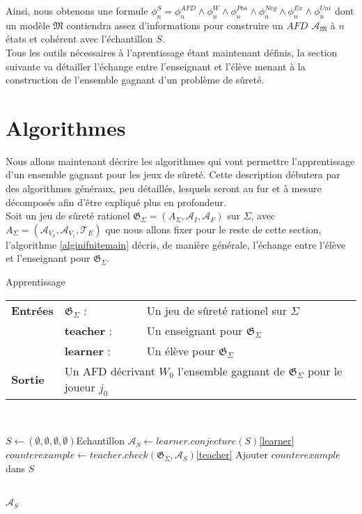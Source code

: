 \documentclass[12pt,a4paper,oneside,titlepage]{report}
\begin{document}
Ainsi, nous obtenons une formule $\phi^S_n=\phi_n^{AFD}\land\phi_n^{W}\land\phi_n^{Pos}\land\phi_n^{Neg}\land\phi_n^{Ex}\land\phi_n^{Uni}$ dont un modèle $\mathfrak{M}$ contiendra assez d'informations pour construire un $AFD$ $\mathcal{A}_\mathfrak{M}$ à $n$ états et cohérent avec l'échantillon $S$.\\

Tous les outils nécessaires à l'aprentissage étant maintenant définis, la section suivante va détailler l'échange entre l'enseignant et l'élève menant à la construction de l'ensemble gagnant d'un problème de sûreté.
\newpage
\section{Algorithmes}
Nous allons maintenant décrire les algorithmes qui vont permettre l'apprentissage d'un ensemble gagnant pour les jeux de sûreté. 
Cette description débutera par des algorithmes généraux, peu détaillés, lesquels seront au fur et à mesure décomposés afin d'être expliqué plus en profondeur.\\
Soit un jeu de sûreté rationel $\mathfrak{G}_\Sigma=(A_\Sigma, \mathcal{A}_I, \mathcal{A}_F)$ sur $\Sigma$, avec $A_\Sigma=(\mathcal{A}_{V_0}, \mathcal{A}_{V_1}, \mathcal{T}_E)$ que nous allons fixer pour le reste de cette section, l'algorithme \ref{alginifnitemain} décris, de manière générale, l'échange entre l'élève et l'enseignant pour $\mathfrak{G}_\Sigma$.
\begin{algorithm}[H]
\caption{Apprentissage}\label{alginifnitemain}
\hspace*{\algorithmicindent} 
\begin{tabular}{lll}
	\textbf{Entrées} & \textbf{$\mathfrak{G}_\Sigma$} : &Un jeu de sûreté rationel sur $\Sigma$\\
	&\textbf{teacher} : &Un enseignant pour $\mathfrak{G}_\Sigma$\\
	&\textbf{learner} : &Un élève pour $\mathfrak{G}_\Sigma$\\
	\textbf{Sortie} &\multicolumn{2}{l}{Un AFD décrivant $W_0$ l'ensemble gagnant de $\mathfrak{G}_\Sigma$ pour le joueur $j_0$}\\
\end{tabular}\\
\begin{algorithmic}[1]
\State $S\gets(\emptyset,\emptyset,\emptyset,\emptyset)$\Comment Echantillon
\Repeat
	\State $\mathcal{A}_S \gets learner.conjecture(S)$\Comment \ref{learner}
	\State $counterexample\gets teacher.check(\mathfrak{G}_\Sigma, \mathcal{A}_S)$\Comment\ref{teacher}
		\State Ajouter $counterexample$ dans $S$
	\EndIf
		
\\
\Return $\mathcal{A}_S$
\end{algorithmic}
\end{algorithm}
\end{document}
